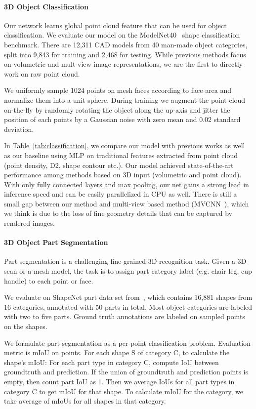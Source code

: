 \documentclass[10pt,twocolumn,letterpaper]{article}
\begin{document}
\paragraph{3D Object Classification} Our network learns global point cloud feature that can be used for object classification. We evaluate our model on the ModelNet40~\cite{wu20153d} shape classification benchmark. There are 12,311 CAD models from 40 man-made object categories, split into 9,843 for training and 2,468 for testing. While previous methods focus on volumetric and mult-view image representations, we are the first to directly work on raw point cloud.

We uniformly sample 1024 points on mesh faces according to face area and normalize them into a unit sphere. During training we augment the point cloud on-the-fly by randomly rotating the object along the up-axis and jitter the position of each points by a Gaussian noise with zero mean and 0.02 standard deviation. 


In Table~\ref{tab:classification}, we compare our model with previous works as well as our baseline using MLP on traditional features extracted from point cloud (point density, D2, shape contour etc.).
Our model achieved state-of-the-art performance among methods based on 3D input (volumetric and point cloud). With only fully connected layers and max pooling, our net gains a strong lead in inference speed and can be easily parallelized in CPU as well. There is still a small gap between our method and multi-view based method (MVCNN~\cite{su15mvcnn}), which we think is due to the loss of fine geometry details that can be captured by rendered images.

\paragraph{3D Object Part Segmentation} Part segmentation is a challenging fine-grained 3D recognition task. Given a 3D scan or a mesh model, the task is to assign part category label (e.g. chair leg, cup handle) to each point or face.




We evaluate on ShapeNet part data set from~\cite{Yi16}, which contains 16,881 shapes from 16 categories, annotated with 50 parts in total. Most object categories are labeled with two to five parts. Ground truth annotations are labeled on sampled points on the shapes.

We formulate part segmentation as a per-point classification problem. Evaluation metric is mIoU on points. For each shape S of category C, to calculate the shape's mIoU: For each part type in category C, compute IoU between groundtruth and prediction. If the union of groundtruth and prediction points is empty, then count part IoU as 1. Then we average IoUs for all part types in category C to get mIoU for that shape. To calculate mIoU for the category, we take average of mIoUs for all shapes in that category. 
\end{document}
